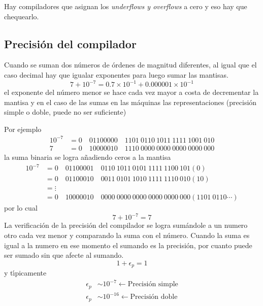 \documentclass[spanish,titlepage,11pt]{article}
\begin{document}
Hay compiladores que asignan los \textit{underflows y overflows} a cero y eso
hay que chequearlo.

\subsection{Precisi\'{o}n del compilador}

Cuando se suman dos n\'{u}meros de \'{o}rdenes de magnitud diferentes, al
igual que el caso decimal hay que igualar exponentes para luego sumar las
mantisas.
\begin{equation}
7+10^{-7}=0.7\times10^{-1}+0.000001\times10^{-1}%
\end{equation}
el exponente del n\'{u}mero menor se hace cada vez mayor a costa de
decrementar la mantisa y en el caso de las sumas en las m\'{a}quinas las
representaciones (precisi\'{o}n simple o doble, puede no ser suficiente)

Por ejemplo
\begin{align}
10^{-7}  &  =0\quad01100000\quad1101\ 0110\ 1011\ 1111\ 1001\ 010\\
7  &  =0\quad10000010\quad1110\ 0000\ 0000\ 0000\ 0000\ 000
\end{align}
la suma binaria se logra a\~{n}adiendo ceros a la mantisa
\begin{align}
10^{-7}  &  =0\quad01100001\quad0110\ 1011\ 0101\ 1111\ 1100\ 101\left(
0\right) \\
&  =0\quad01100010\quad0011\ 0101\ 1010\ 1111\ 1110\ 010\left(  10\right) \\
&  =\vdots\\
&  =0\quad10000010\quad0000\ 0000\ 0000\ 0000\ 0000\ 000\left(
1101\ 0110\cdots\right)
\end{align}
por lo cual
\begin{equation}
7+10^{-7}=7
\end{equation}
La verificaci\'{o}n de la precisi\'{o}n del compilador se logra sum\'{a}ndole
a un numero otro cada vez menor y comparando la suma con el n\'{u}mero. Cuando
la suma es igual a la numero en ese momento el sumando es la precisi\'{o}n,
por cuanto puede ser sumado sin que afecte al sumando.
\begin{equation}
1+\epsilon_{p}=1
\end{equation}
y t\'{\i}picamente
\begin{align}
\epsilon_{p}  &  \sim10^{-7}\longleftarrow\text{Precisi\'{o}n simple}\\
\epsilon_{p}  &  \sim10^{-16}\longleftarrow\text{Precisi\'{o}n doble}%
\end{align}
\end{document}
